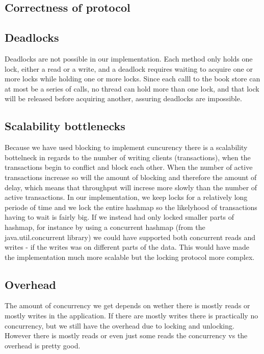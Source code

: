 \documentclass{article}
\theoremstyle{plain}
\theoremstyle{nonumberplain}
\begin{document}
\subsection{Correctness of protocol}



\subsection{Deadlocks}

Deadlocks are not possible in our implementation. Each method only holds one lock, either a read or a write, and a deadlock requires waiting to acquire one or more locks while holding one or more locks. Since each calll to the book store can at most be a series of calls, no thread can hold more than one lock, and that lock will be released before acquiring another, assuring deadlocks are impossible.

\subsection{Scalability bottlenecks}
Because we have used blocking to implement cuncurency there is a scalability bottelneck in regards to the number of writing clients (transactions), when the transactions begin to conflict and block each other. 
When the number of active transactions increase so will the amount of blocking and therefore the amount of delay, which means that throughput will increse more slowly than the number of active transactions. 
In our implementation, we keep locks for a relatively long periode of time and we lock the entire hashmap so the likelyhood of transactions having to wait is fairly big.
If we instead had only locked smaller parts of hashmap, for instance by using a concurrent hashmap (from the java.util.concurrent library) we could have supported both concurrent reads and writes - if the writes was on different parts of the data. This would have made the implementation much more scalable but the locking protocol more complex.

\subsection{Overhead}
The amount of concurrency we get depends on wether there is mostly reads or mostly writes in the application. If there are mostly writes there is practically no concurrency, but we still have the overhead due to locking and unlocking. However there is mostly reads or even just some reads the concurrency vs the overhead is pretty good.
\end{document}
